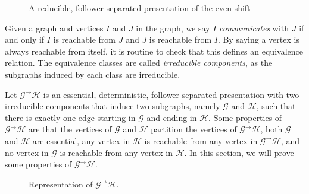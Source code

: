 \documentclass[hidelinks]{report}
\newcommand{\Gc}{\mathcal{G}}  %
\newcommand{\Hc}{\mathcal{H}}  %
\newcommand{\GtH}{{\Gc^\to\Hc}}
\newcommand{\term}[1]{\textit{#1}}
\theoremstyle{definition}
\begin{document}
\begin{figure}[h]
    \centering

    \caption{A reducible, follower-separated presentation of the even shift}
    \label{reducibleevenshift}
\end{figure}

Given a graph and vertices \(I\) and \(J\) in the graph, we say \(I\) \term{communicates} with \(J\) if and only if 
\(I\) is reachable from \(J\) and \(J\) is reachable from \(I\). By saying 
a vertex is always reachable from itself, it is routine to check that this defines 
an equivalence relation. The equivalence classes are called \term{irreducible components},
as the subgraphs induced by each class are irreducible.

Let \term{\(\GtH\)} is an essential, deterministic, follower-separated presentation with two irreducible components
that induce two subgraphs, namely \(\Gc\) and \(\Hc\), such that there is 
exactly one edge starting in \(\Gc\) and ending in \(\Hc\). 
Some properties of \(\GtH\) are that the vertices of \(\Gc\) and \(\Hc\)
partition the vertices of \(\GtH\), both \(\Gc\) and \(\Hc\) are essential,  
any vertex in \(\Hc\) is reachable from any vertex in \(\GtH\), and no vertex in \(\Gc\) 
is reachable from any vertex in \(\Hc\). In this section, we will 
prove some properties of \(\GtH\).

\begin{figure}[h]
    \centering
    \caption{Representation of \(\GtH\).}
\end{figure}
\end{document}
